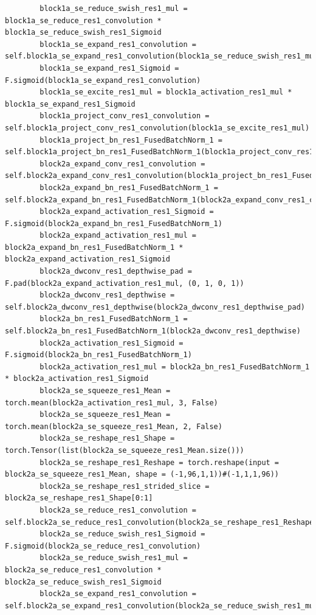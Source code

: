 \documentclass{fisatprojectfinal}
\begin{document}
\begin{appendices}
\begin{lstlisting}
        block1a_se_reduce_swish_res1_mul = block1a_se_reduce_res1_convolution * block1a_se_reduce_swish_res1_Sigmoid
        block1a_se_expand_res1_convolution = self.block1a_se_expand_res1_convolution(block1a_se_reduce_swish_res1_mul)
        block1a_se_expand_res1_Sigmoid = F.sigmoid(block1a_se_expand_res1_convolution)
        block1a_se_excite_res1_mul = block1a_activation_res1_mul * block1a_se_expand_res1_Sigmoid
        block1a_project_conv_res1_convolution = self.block1a_project_conv_res1_convolution(block1a_se_excite_res1_mul)
        block1a_project_bn_res1_FusedBatchNorm_1 = self.block1a_project_bn_res1_FusedBatchNorm_1(block1a_project_conv_res1_convolution)
        block2a_expand_conv_res1_convolution = self.block2a_expand_conv_res1_convolution(block1a_project_bn_res1_FusedBatchNorm_1)
        block2a_expand_bn_res1_FusedBatchNorm_1 = self.block2a_expand_bn_res1_FusedBatchNorm_1(block2a_expand_conv_res1_convolution)
        block2a_expand_activation_res1_Sigmoid = F.sigmoid(block2a_expand_bn_res1_FusedBatchNorm_1)
        block2a_expand_activation_res1_mul = block2a_expand_bn_res1_FusedBatchNorm_1 * block2a_expand_activation_res1_Sigmoid
        block2a_dwconv_res1_depthwise_pad = F.pad(block2a_expand_activation_res1_mul, (0, 1, 0, 1))
        block2a_dwconv_res1_depthwise = self.block2a_dwconv_res1_depthwise(block2a_dwconv_res1_depthwise_pad)
        block2a_bn_res1_FusedBatchNorm_1 = self.block2a_bn_res1_FusedBatchNorm_1(block2a_dwconv_res1_depthwise)
        block2a_activation_res1_Sigmoid = F.sigmoid(block2a_bn_res1_FusedBatchNorm_1)
        block2a_activation_res1_mul = block2a_bn_res1_FusedBatchNorm_1 * block2a_activation_res1_Sigmoid
        block2a_se_squeeze_res1_Mean = torch.mean(block2a_activation_res1_mul, 3, False)
        block2a_se_squeeze_res1_Mean = torch.mean(block2a_se_squeeze_res1_Mean, 2, False)
        block2a_se_reshape_res1_Shape = torch.Tensor(list(block2a_se_squeeze_res1_Mean.size()))
        block2a_se_reshape_res1_Reshape = torch.reshape(input = block2a_se_squeeze_res1_Mean, shape = (-1,96,1,1))#(-1,1,1,96))
        block2a_se_reshape_res1_strided_slice = block2a_se_reshape_res1_Shape[0:1]
        block2a_se_reduce_res1_convolution = self.block2a_se_reduce_res1_convolution(block2a_se_reshape_res1_Reshape)
        block2a_se_reduce_swish_res1_Sigmoid = F.sigmoid(block2a_se_reduce_res1_convolution)
        block2a_se_reduce_swish_res1_mul = block2a_se_reduce_res1_convolution * block2a_se_reduce_swish_res1_Sigmoid
        block2a_se_expand_res1_convolution = self.block2a_se_expand_res1_convolution(block2a_se_reduce_swish_res1_mul)

\end{lstlisting}
\end{appendices}
\end{document}
